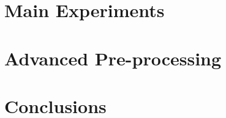 \documentclass[12pt]{article}
\begin{document}


\section{Main Experiments}







\section{Advanced Pre-processing}

\section{Conclusions}







\newpage



\end{document}
